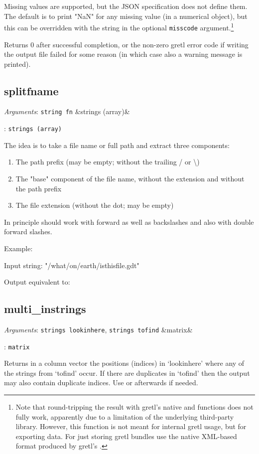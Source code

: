 \documentclass[11pt,english]{article}
\newcommand{\ArgRet}[2]{%
  {\it Arguments}: {#1}%
  \ifx&#2&%
  \else
  \par\smallskip\noindent {\it Return type}: \texttt{#2}
  \fi%
  \par\medskip\par%
  }
\begin{document}
Missing values are supported, but the JSON specification does not define them. The 
default is to print "NaN" for any missing value (in a numerical object), but this can 
be overridden with the string in the optional \texttt{misscode} argument.\footnote{Note 
that round-tripping the result with gretl's native  and  
functions does not fully work, apparently due to a limitation of the underlying third-party
library. However, this function is not meant for internal gretl usage, but for exporting data.
For just storing gretl bundles use the native XML-based format produced by gretl's
.}

Returns 0 after successful completion, or the non-zero gretl error code if writing the 
output file failed for some reason (in which case also a warning message is printed).

\subsection{splitfname}

\ArgRet{\texttt{string fn}}{strings (array)}

The idea is to take a file name or full path and extract three components:
\begin{enumerate}
\item The path prefix (may be empty; without the trailing / or \textbackslash)
\item The "base" component of the file name, without the extension and without the path prefix 
\item The file extension (without the dot; may be empty)
\end{enumerate}	
In principle should work with forward as well as backslashes and also with double forward slashes.

Example:

Input string: "/what/on/earth/isthisfile.gdt"

Output equivalent to: 


\subsection{multi\_instrings}

\ArgRet{\texttt{strings lookinhere}, \texttt{strings tofind}}{matrix}

Returns in a column vector the positions (indices) in `lookinhere' where any of the 
strings from `tofind' occur. If there are duplicates in `tofind' then the output 
may also contain duplicate indices. Use  or  afterwards if needed. 
\end{document}

